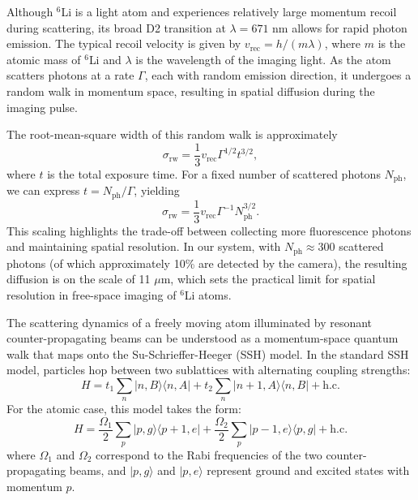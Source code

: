 Although $^6$Li is a light atom and experiences relatively large momentum recoil during scattering, its broad D2 transition at $\lambda = 671$ nm allows for rapid photon emission. The typical recoil velocity is given by $v_\mathrm{rec} = h/(m\lambda)$, where $m$ is the atomic mass of $^6$Li and $\lambda$ is the wavelength of the imaging light. As the atom scatters photons at a rate $\Gamma$, each with random emission direction, it undergoes a random walk in momentum space, resulting in spatial diffusion during the imaging pulse.

The root-mean-square width of this random walk is approximately \cite{kruip_design_2024}
\begin{equation}
\sigma_\mathrm{rw} = \frac{1}{3} v_\mathrm{rec} \Gamma^{1/2} t^{3/2},
\label{eq:sigmarw}
\end{equation}
where $t$ is the total exposure time. For a fixed number of scattered photons $N_\mathrm{ph}$, we can express $t = N_\mathrm{ph}/\Gamma$, yielding
\begin{equation}
\sigma_\mathrm{rw} = \frac{1}{3} v_\mathrm{rec} \Gamma^{-1} N_\mathrm{ph}^{3/2}.
\end{equation}
This scaling highlights the trade-off between collecting more fluorescence photons and maintaining spatial resolution. In our system, with $N_\mathrm{ph} \approx 300$ scattered photons (of which approximately 10\% are detected by the camera), the resulting diffusion is on the scale of 11 $\mu$m, which sets the practical limit for spatial resolution in free-space imaging of $^6$Li atoms.


The scattering dynamics of a freely moving atom illuminated by resonant counter-propagating beams can be understood as a momentum-space quantum walk that maps onto the Su-Schrieffer-Heeger (SSH) model. In the standard SSH model, particles hop between two sublattices with alternating coupling strengths:
\begin{equation}
H = t_1 \sum_n |n,B\rangle \langle n,A| + t_2 \sum_n |n+1,A\rangle \langle n,B| + \text{h.c.}
\end{equation}
For the atomic case, this model takes the form:
\begin{equation}
H = \frac{\Omega_1}{2} \sum_p |p,g\rangle \langle p+1,e| + \frac{\Omega_2}{2} \sum_p |p-1,e\rangle \langle p,g| + \text{h.c.}
\end{equation}
where $\Omega_1$ and $\Omega_2$ correspond to the Rabi frequencies of the two counter-propagating beams, and $|p,g\rangle$ and $|p,e\rangle$ represent ground and excited states with momentum $p$.

